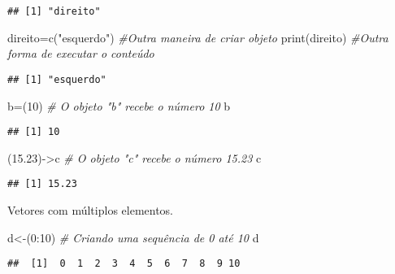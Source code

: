 \documentclass[
]{book}
\newenvironment{Shaded}{\begin{snugshade}}{\end{snugshade}}
\newcommand{\CommentTok}[1]{\textcolor[rgb]{0.56,0.35,0.01}{\textit{#1}}}
\newcommand{\DecValTok}[1]{\textcolor[rgb]{0.00,0.00,0.81}{#1}}
\newcommand{\FloatTok}[1]{\textcolor[rgb]{0.00,0.00,0.81}{#1}}
\newcommand{\FunctionTok}[1]{\textcolor[rgb]{0.00,0.00,0.00}{#1}}
\newcommand{\NormalTok}[1]{#1}
\newcommand{\OtherTok}[1]{\textcolor[rgb]{0.56,0.35,0.01}{#1}}
\newcommand{\SpecialCharTok}[1]{\textcolor[rgb]{0.00,0.00,0.00}{#1}}
\newcommand{\StringTok}[1]{\textcolor[rgb]{0.31,0.60,0.02}{#1}}
\begin{document}
\begin{verbatim}
## [1] "direito"
\end{verbatim}

\begin{Shaded}
\begin{Highlighting}[]
\NormalTok{direito}\OtherTok{=}\FunctionTok{c}\NormalTok{(}\StringTok{"esquerdo"}\NormalTok{) }\CommentTok{\#Outra maneira de criar objeto  }
\FunctionTok{print}\NormalTok{(direito) }\CommentTok{\#Outra forma de executar o conteúdo}
\end{Highlighting}
\end{Shaded}

\begin{verbatim}
## [1] "esquerdo"
\end{verbatim}

\begin{Shaded}
\begin{Highlighting}[]
\NormalTok{b}\OtherTok{=}\NormalTok{(}\DecValTok{10}\NormalTok{) }\CommentTok{\# O objeto "b" recebe o número 10}
\NormalTok{b}
\end{Highlighting}
\end{Shaded}

\begin{verbatim}
## [1] 10
\end{verbatim}

\begin{Shaded}
\begin{Highlighting}[]
\NormalTok{(}\FloatTok{15.23}\NormalTok{)}\OtherTok{{-}\textgreater{}}\NormalTok{c }\CommentTok{\# O objeto "c" recebe o número 15.23}
\NormalTok{c}
\end{Highlighting}
\end{Shaded}

\begin{verbatim}
## [1] 15.23
\end{verbatim}

Vetores com múltiplos elementos.

\begin{Shaded}
\begin{Highlighting}[]
\NormalTok{d}\OtherTok{\textless{}{-}}\NormalTok{(}\DecValTok{0}\SpecialCharTok{:}\DecValTok{10}\NormalTok{) }\CommentTok{\# Criando uma sequência de 0 até 10}
\NormalTok{d}
\end{Highlighting}
\end{Shaded}

\begin{verbatim}
##  [1]  0  1  2  3  4  5  6  7  8  9 10
\end{verbatim}
\end{document}
